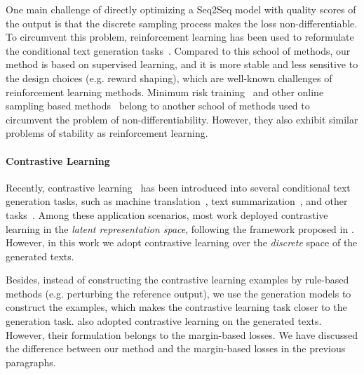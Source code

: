 \documentclass[11pt]{article}
\begin{document}
One main challenge of directly optimizing a Seq2Seq model with quality scores of the output is that the discrete sampling process makes the loss non-differentiable. 
To circumvent this problem, reinforcement learning has been used to reformulate the conditional text generation tasks~\citep{ DBLP:journals/corr/RanzatoCAZ15, DBLP:journals/corr/BahdanauBXGLPCB16, li-etal-2016-deep, paulus2018a, li-etal-2019-deep}.
Compared to this school of methods, our method is based on supervised learning, and it is more stable and less sensitive to the design choices (e.g. reward shaping), which are well-known challenges of reinforcement learning methods.
Minimum risk training~\citep{shen-etal-2016-minimum, wieting-etal-2019-beyond} and other online sampling based methods~\citep{10.5555/2969239.2969370, NIPS2016_2f885d0f, zhang-etal-2019-bridging} belong to another school of methods used to circumvent the problem of non-differentiability. However, they also exhibit similar problems of stability as reinforcement learning.


\paragraph{Contrastive Learning}

Recently, contrastive learning~\citep{10.1109/CVPR.2006.100} has been introduced into several conditional text generation tasks, such as machine translation~\citep{yang-etal-2019-reducing, pan-etal-2021-contrastive}, text summarization~\citep{cao-wang-2021-cliff, DBLP:journals/corr/abs-2109-03481, DBLP:journals/corr/abs-2108-11846}, and other tasks~\citep{uehara-etal-2020-learning,cho-etal-2021-contrastive, lee2021contrastive}. 
Among these application scenarios, most work deployed contrastive learning in the \textit{latent representation space}, following the framework proposed in \citet{pmlr-v119-chen20j}.
However, in this work we adopt contrastive learning over the \textit{discrete} space of the generated texts.

Besides, instead of constructing the contrastive learning examples by rule-based methods (e.g. perturbing the reference output), we use the generation models to construct the examples, which makes the contrastive learning task closer to the generation task.
\citet{DBLP:journals/corr/abs-2108-11846} also adopted contrastive learning on the generated texts. 
However, their formulation belongs to the margin-based losses.
We have discussed the difference between our method and the margin-based losses in the previous paragraphs.
\end{document}
